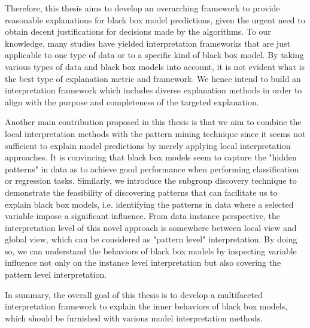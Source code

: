 Therefore, this thesis aims to develop an overarching framework to provide reasonable explanations for black box model predictions, given the urgent need to obtain decent justifications for decisions made by the algorithms. To our knowledge, many studies have yielded interpretation frameworks that are just applicable to one type of data or to a specific kind of black box model. By taking various types of data and black box models into account, it is not evident what is the best type of explanation metric and framework. We hence intend to build an interpretation framework which includes diverse explanation methods in order to align with the purpose and completeness of the targeted explanation. 

Another main contribution proposed in this thesis is that we aim to combine the local interpretation methods with the pattern mining technique since it seems not sufficient to explain model predictions by merely applying local interpretation approaches. It is convincing that black box models seem to capture the "hidden patterns" in data as to achieve good performance when performing classification or regression tasks. Similarly, we introduce the subgroup discovery technique to demonstrate the feasibility of discovering patterns that can facilitate us to explain black box models, i.e. identifying the patterns in data where a selected variable impose a significant influence. From data instance perspective, the interpretation level of this novel approach is somewhere between local view and global view, which can be considered as "pattern level" interpretation. By doing so, we can understand the behaviors of black box models by inspecting variable influence not only on the instance level interpretation but also covering the pattern level interpretation. 

In summary, the overall goal of this thesis is to develop a multifaceted interpretation framework to explain the inner behaviors of black box models, which should be furnished with various model interpretation methods. 


